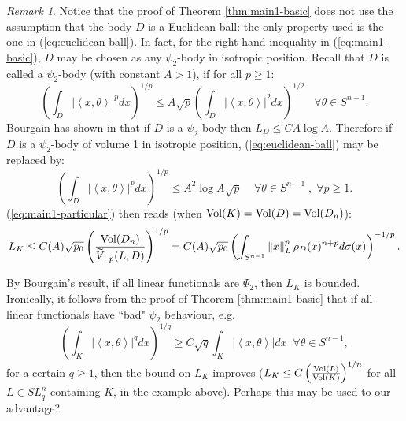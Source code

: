 \documentclass[12pt,oneside]{amsart}
\theoremstyle{definition}
\theoremstyle{remark}
\newtheorem{rem}[thm]{Remark}
\theoremstyle{proof}
\numberwithin{equation}{section}
\newcommand{\norm}[1]{\left\Vert#1\right\Vert}
\newcommand{\abs}[1]{\left\vert#1\right\vert}
\newcommand{\set}[1]{\left\{#1\right\}}
\newcommand{\brac}[1]{\left(#1\right)}
\newcommand{\scalar}[1]{\left \langle #1 \right \rangle}
\newcommand{\Vol}[1]{\textnormal{Vol} (#1)}
\newcommand{\VolRatio}[2]{\brac{\frac{\Vol{#1}}{\Vol{#2}}}^{1/n}}
\begin{document}



\begin{rem} \label{rem:psi_2}
Notice that the proof of Theorem \ref{thm:main1-basic} does not
use the assumption that the body $D$ is a Euclidean ball: the only
property used is the one in (\ref{eq:euclidean-ball}). In fact,
for the right-hand inequality in (\ref{eq:main1-basic}), $D$ may
be chosen as any $\psi_2$-body in isotropic position. Recall that
$D$ is called a $\psi_2$-body (with constant $A>1$), if for all $p
\geq 1$:
\[
\brac{\int_D \abs{\scalar{x,\theta}}^p dx}^{1/p} \leq A \sqrt{p}
\brac{\int_D \abs{\scalar{x,\theta}}^2 dx}^{1/2} \;\; \; \forall
\theta \in S^{n-1}.
\]
Bourgain has shown in \cite{Bourgain-Psi-2-Bodies} that if $D$ is
a $\psi_2$-body then $L_D \leq C A \log{A}$. Therefore if $D$ is a
$\psi_2$-body of volume 1 in isotropic position,
(\ref{eq:euclidean-ball}) may be replaced by:
\[
\brac{\int_D \abs{\scalar{x,\theta}}^p dx}^{1/p} \leq A^2 \log{A}
\sqrt{p}  \;\;\; \; \forall \theta \in S^{n-1} \; , \; \forall p
\geq 1.
\]
(\ref{eq:main1-particular}) then reads (when
$\Vol{K}=\Vol{D}=\Vol{D_n}$):
\[
L_K \leq C(A) \sqrt{p_0}
\brac{\frac{\Vol{D_n}}{\widetilde{V}_{-p}(L,D)}}^{1/p} = C(A)
\sqrt{p_0} \brac{ \int_{S^{n-1}} \norm{x}^p_L \rho_D(x)^{n+p}
d\sigma(x)}^{-1/p}.
\]

By Bourgain's result, if all linear functionals are $\Psi_2$,
then $L_K$ is bounded. Ironically, it follows from the proof of
Theorem \ref{thm:main1-basic} that if all linear functionals have
``bad" $\psi_2$ behaviour, e.g.
\[
\brac{\int_K \abs{\scalar{x,\theta}}^q dx}^{1/q} \geq C \sqrt{q}
\int_K \abs{\scalar{x,\theta}} dx \;\; \forall \theta \in S^{n-1},
\]
for a certain $q\geq 1$, then the bound on $L_K$ improves ($L_K
\leq C \VolRatio{L}{K}$ for all $L\in SL_q^n$ containing $K$, in
the example above). Perhaps this may be used to our advantage?
\end{rem}

\end{document}
